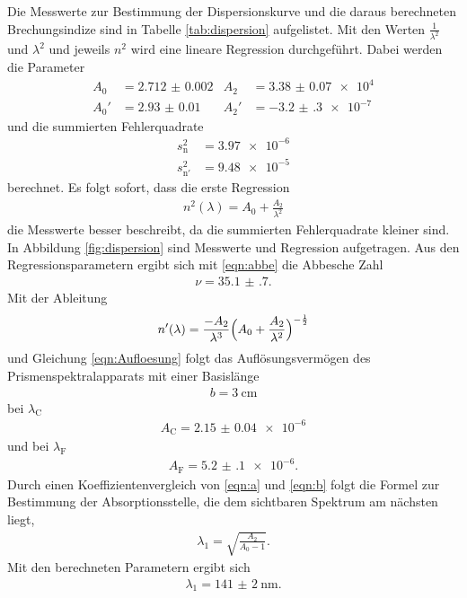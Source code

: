 Die Messwerte zur Bestimmung der Dispersionskurve und die daraus berechneten
Brechungsindize sind in Tabelle \ref{tab:dispersion}
aufgelistet.
Mit den Werten $\frac{1}{\lambda^2}$ und $\lambda^2$ und jeweils $n^2$ wird
eine lineare Regression durchgeführt. Dabei werden die Parameter
\begin{align}
  A_0 & = \num{2.712(2)} & A_2 & = \num{3.38(7)e4} \\
  A_0' & = \num{2.93(1)} & A_2' & = -\num{3.2(3)e-7}
\end{align}
und die summierten Fehlerquadrate
\begin{align}
  s_\text{n}^2 & = \num{3.97e-6} \\
  s_{\text{n}'}^2 & = \num{9.48e-5}
\end{align}
berechnet. Es folgt sofort, dass die erste Regression
\begin{align}
  n^2(\lambda) = A_0 + \frac{A_2}{\lambda^2}
\end{align}
die Messwerte besser beschreibt, da die summierten Fehlerquadrate kleiner sind.
In Abbildung \ref{fig:dispersion} sind Messwerte und Regression aufgetragen.
Aus den Regressionsparametern ergibt sich mit \eqref{eqn:abbe} die
Abbesche Zahl
\begin{align}
  \nu = \num{35.1(7)}.
\end{align}
Mit der Ableitung
\begin{align}
  n'(\lambda) = \frac{-A_2}{\lambda^3}\Bigl(A_0 + \frac{A_2}{\lambda^2}\Bigr)^{-\frac{1}{2}}
\end{align}
und Gleichung \eqref{eqn:Aufloesung} folgt das Auflösungsvermögen des
Prismenspektralapparats mit einer Basislänge
\begin{align}
  b = \SI{3}{\centi\meter}
\end{align}
bei $\lambda_\text{C}$
\begin{align}
  A_\text{C} = \num{2.15(4)e-6}
\end{align}
und bei $\lambda_\text{F}$
\begin{align}
  A_\text{F} = \num{5.2(1)e-6}.
\end{align}
Durch einen Koeffizientenvergleich von \eqref{eqn:a} und \eqref{eqn:b}
folgt die Formel zur Bestimmung der Absorptionsstelle, die
dem sichtbaren Spektrum am nächsten liegt,
\begin{align}
  \lambda_1 = \sqrt{\frac{A_2}{A_0 - 1}}.
\end{align}
Mit den berechneten Parametern ergibt sich
\begin{align}
  \lambda_1 = \SI{141(2)}{\nano\meter}.
\end{align}

